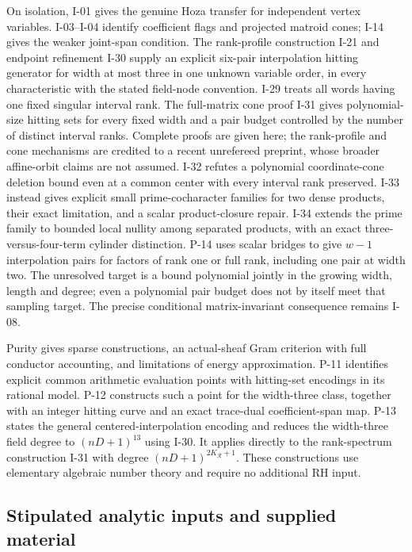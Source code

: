 On isolation, I-01 gives the genuine Hoza transfer for independent vertex variables. I-03--I-04 identify coefficient flags and projected matroid cones; I-14 gives the weaker joint-span condition. The rank-profile construction I-21 and endpoint refinement I-30 supply an explicit six-pair interpolation hitting generator for width at most three in one unknown variable order, in every characteristic with the stated field-node convention. I-29 treats all words having one fixed singular interval rank. The full-matrix cone proof I-31 gives polynomial-size hitting sets for every fixed width and a pair budget controlled by the number of distinct interval ranks. Complete proofs are given here; the rank-profile and cone mechanisms are credited to a recent unrefereed preprint, whose broader affine-orbit claims are not assumed. I-32 refutes a polynomial coordinate-cone deletion bound even at a common center with every interval rank preserved. I-33 instead gives explicit small prime-cocharacter families for two dense products, their exact limitation, and a scalar product-closure repair. I-34 extends the prime family to bounded local nullity among separated products, with an exact three-versus-four-term cylinder distinction. P-14 uses scalar bridges to give $w-1$ interpolation pairs for factors of rank one or full rank, including one pair at width two. The unresolved target is a bound polynomial jointly in the growing width, length and degree; even a polynomial pair budget does not by itself meet that sampling target. The precise conditional matrix-invariant consequence remains I-08.

Purity gives sparse constructions, an actual-sheaf Gram criterion with full conductor accounting, and limitations of energy approximation. P-11 identifies explicit common arithmetic evaluation points with hitting-set encodings in its rational model. P-12 constructs such a point for the width-three class, together with an integer hitting curve and an exact trace-dual coefficient-span map. P-13 states the general centered-interpolation encoding and reduces the width-three field degree to $(nD+1)^{13}$ using I-30. It applies directly to the rank-spectrum construction I-31 with degree $(nD+1)^{2K_{\mathcal R}+1}$. These constructions use elementary algebraic number theory and require no additional RH input.

\subsection{Stipulated analytic inputs and supplied material}

